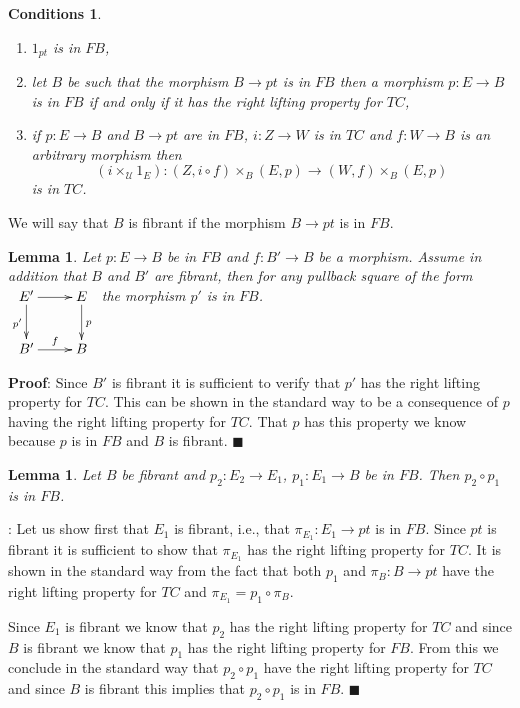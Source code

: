 \documentclass[12pt]{article}
\numberwithin{equation}{section}
\newenvironment{myproof}{{\bf Proof}:}{$\blacksquare$ \vskip 5mm }
\newtheorem{lemma}[proposition]{Lemma}
\newtheorem{cond}[proposition]{Conditions}
\newcommand{\llabel}[1]{\label{#1}}
\newcommand{\sr}{\rightarrow}
\newcommand{\id}{1}            %
\newcommand{\U}{\mathcal{U}}
\begin{document}
%
\begin{cond}\llabel{2015.05.22.cond1}
%
\begin{enumerate}
\item $\id_{pt}$ is in $FB$,
\item let $B$ be such that the morphism $B\sr pt$ is in $FB$ then a morphism
  $p:E\sr B$ is in $FB$ if and only if it has the right lifting property for
  $TC$,
\item if $p:E\sr B$ and $B\sr pt$ are in $FB$, $i:Z\sr W$ is in $TC$ and
  $f:W\sr B$ is an arbitrary morphism then
%
$$(i\times_\U \id_E):(Z,i\circ f)\times_B (E,p)\sr (W,f)\times_B (E,p)$$
%
is in $TC$.
%
\end{enumerate}
\end{cond}
%
We will say that $B$ is fibrant if the morphism $B\sr pt$ is in $FB$.
%
\begin{lemma}
\llabel{2015.05.14.l2} Let $p:E\sr B$ be in $FB$ and $f:B'\sr B$ be a
morphism. Assume in addition that $B$ and $B'$ are fibrant, then for any
pullback square of the form
%
$
\begin{xy}
          \xymatrix@C=2pc{ E' \ar[r] \ar[d]_{p'} & E \ar[d]^{p}\\ B'
            \ar[r]^-{f} & B }
\end{xy}
$
%
the morphism $p'$ is in $FB$.
\end{lemma}
%
\begin{myproof}
Since $B'$ is fibrant it is sufficient to verify that $p'$ has the right
lifting property for $TC$. This can be shown in the standard way to be a
consequence of $p$ having the right lifting property for $TC$. That $p$ has
this property we know because $p$ is in $FB$ and $B$ is fibrant.
\end{myproof}
%
\begin{lemma}
\llabel{2015.05.14.l4} Let $B$ be fibrant and $p_2:E_2\sr E_1$, $p_1:E_1\sr B$
be in $FB$. Then $p_2\circ p_1$ is in $FB$.
\end{lemma}
%
\begin{myproof}
Let us show first that $E_1$ is fibrant, i.e., that $\pi_{E_1}:E_1\sr pt$ is in
$FB$. Since $pt$ is fibrant it is sufficient to show that $\pi_{E_1}$ has the
right lifting property for $TC$. It is shown in the standard way from the fact
that both $p_1$ and $\pi_B:B\sr pt$ have the right lifting property for $TC$
and $\pi_{E_1}=p_1\circ \pi_B$.

Since $E_1$ is fibrant we know that $p_2$ has the right lifting property for
$TC$ and since $B$ is fibrant we know that $p_1$ has the right lifting property
for $FB$. From this we conclude in the standard way that $p_2\circ p_1$ have
the right lifting property for $TC$ and since $B$ is fibrant this implies that
$p_2\circ p_1$ is in $FB$.
\end{myproof}
\end{document}

